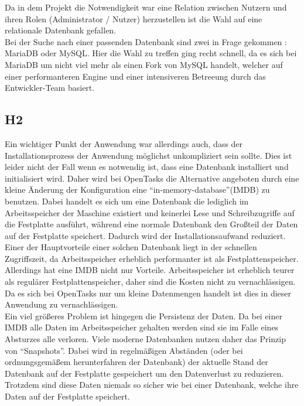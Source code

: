 Da in dem Projekt die Notwendigkeit war eine Relation zwischen Nutzern und ihren Rolen (Administrator / Nutzer) herzustellen ist die Wahl auf eine relationale Datenbank gefallen. \\

Bei der Suche nach einer passenden Datenbank sind zwei in Frage gekommen : MariaDB oder MySQL. Hier die Wahl zu treffen ging recht schnell, da es sich bei MariaDB um nicht viel mehr als einen Fork von MySQL handelt, welcher auf einer performanteren Engine und einer intensiveren Betreeung durch das Entwickler-Team basiert.

\subsection{H2}

Ein wichtiger Punkt der Anwendung war allerdings auch, dass der Installationsprozess der Anwendung möglichst unkompliziert sein sollte. Dies ist leider nicht der Fall wenn es notwendig ist, dass eine Datenbank installiert und initialisiert wird. Daher wird bei OpenTasks die Alternative angeboten durch eine kleine Änderung der Konfiguration eine ``in-memory-database''(IMDB) zu benutzen. Dabei handelt es sich um eine Datenbank die lediglich im Arbeitsspeicher der Maschine existiert und keinerlei Lese und Schreibzugriffe auf die Festplatte ausführt, während eine normale Datenbank den Großteil der Daten auf der Festplatte speichert. Dadurch wird der Installationsaufwand reduziert. \\

Einer der Hauptvorteile einer solchen Datenbank liegt in der schnellen Zugriffszeit, da Arbeitsspeicher erheblich performanter ist als Festplattenspeicher. Allerdings hat eine IMDB nicht nur Vorteile. Arbeitsspeicher ist erheblich teurer als regulärer Festplattenspeicher, daher sind die Kosten nicht zu vernachlässigen. Da es sich bei OpenTasks nur um kleine Datenmengen handelt ist dies in dieser Anwendung zu vernachlässigen. \\
Ein viel größeres Problem ist hingegen die Persistenz der Daten. Da bei einer IMDB alle Daten im Arbeitsspeicher gehalten werden sind sie im Falle eines Absturzes alle verloren. Viele moderne Datenbanken nutzen daher das Prinzip von ``Snapshots''. Dabei wird in regelmäßigen Abständen (oder bei ordnungsgemäßem herunterfahren der Datenbank) der aktuelle Stand der Datenbank auf der Festplatte gespeichert um den Datenverlust zu reduzieren. Trotzdem sind diese Daten niemals so sicher wie bei einer Datenbank, welche ihre Daten auf der Festplatte speichert. \\

